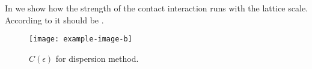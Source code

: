 In  we show how the strength of the contact interaction runs with the lattice scale.  According to  it should be .

\begin{figure}
    \texttt{[image: example-image-b]}
    \caption{$C(\epsilon)$ for dispersion method.  }
    \label{fig:running of strength}
\end{figure}
